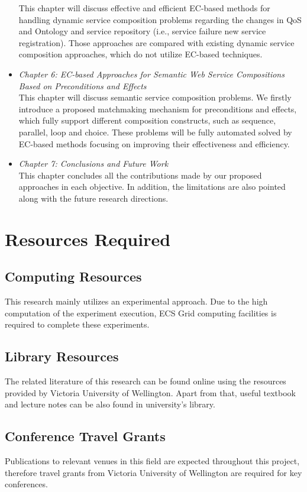 \begin{itemize}
This chapter will discuss effective and efficient EC-based methods for handling dynamic service composition problems regarding the changes in QoS and Ontology and service repository (i.e., service failure new service registration). Those approaches are compared with existing dynamic service composition approaches, which do not utilize EC-based techniques.
 \item \textit{Chapter 6: EC-based Approaches for Semantic Web Service Compositions Based on Preconditions and Effects}\\
This chapter will discuss semantic service composition problems. We firstly introduce a proposed matchmaking mechanism for preconditions and effects, which fully support different composition constructs, such as sequence, parallel, loop and choice. These problems will be fully automated solved by EC-based methods focusing on improving their effectiveness and efficiency.
 \item \textit{Chapter 7: Conclusions and Future Work}\\
This chapter concludes all the contributions made by our proposed approaches in each objective. In addition, the limitations are also pointed along with the future research directions.
\end{itemize}


\section{Resources Required}

\subsection{Computing Resources}
This research mainly utilizes an experimental approach. Due to the high computation of the experiment execution, ECS Grid computing facilities is required to complete these experiments.

\subsection{Library Resources}
The related literature of this research can be found online using the resources provided by Victoria University of Wellington. Apart from that, useful textbook and lecture notes can be also found in university's library.

\subsection{Conference Travel Grants}
Publications to relevant venues in this field are expected throughout this project, therefore travel grants from Victoria University of Wellington are required for key conferences.